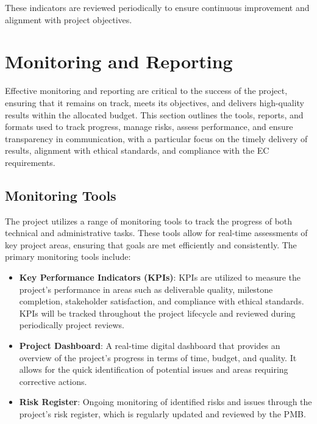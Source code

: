 \documentclass[a4paper,12pt]{article}
\begin{document}
These indicators are reviewed periodically to ensure continuous improvement and alignment with project objectives.



\newpage

\section{\textcolor{EUblue}{Monitoring and Reporting}} 
\label{sec:monitoring_and_reporting}

Effective monitoring and reporting are critical to the success of the project, ensuring that it remains on track, meets its objectives, and delivers high-quality results within the allocated budget. This section outlines the tools, reports, and formats used to track progress, manage risks, assess performance, and ensure transparency in communication, with a particular focus on the timely delivery of results, alignment with ethical standards, and compliance with the EC requirements.

\subsection{\textcolor{EUblue}{Monitoring Tools}}

The project utilizes a range of monitoring tools to track the progress of both technical and administrative tasks. These tools allow for real-time assessments of key project areas, ensuring that goals are met efficiently and consistently. The primary monitoring tools include:

\begin{itemize}[left=1em, itemsep=0pt, topsep=0pt]
    \item \textbf{Key Performance Indicators (KPIs)}: KPIs are utilized to measure the project’s performance in areas such as deliverable quality, milestone completion, stakeholder satisfaction, and compliance with ethical standards. KPIs will be tracked throughout the project lifecycle and reviewed during periodically project reviews. 
    \item \textbf{Project Dashboard}:  A real-time digital dashboard that provides an overview of the project's progress in terms of time, budget, and quality. It allows for the quick identification of potential issues and areas requiring corrective actions.
    \item \textbf{Risk Register}: Ongoing monitoring of identified risks and issues through the project’s risk register, which is regularly updated and reviewed by the PMB.
\end{itemize}
\end{document}
